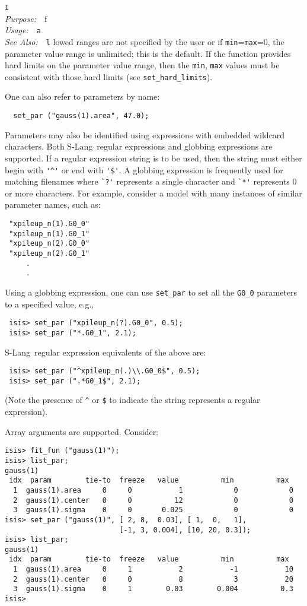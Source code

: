 \documentclass{book}
\makeatletter
\newif\ifpdf
\newcommand{\slang}{{\sc S-Lang}}
\newenvironment{isisfunction}[4]%
{\index{{#1}@{\tt #1}}%
  \ifpdf
  \else
     \addcontentsline{toc}{subsection}{{#1} -- {#2}}
  \fi
  \vbox{
          \vspace*{\baselineskip}
          {\LARGE\tt #1}\vspace*{\baselineskip}\\
          {{\it Purpose:}~~{#2}}\\
          {{\it Usage:}~~{\tt #3}}\\
          {{\it See Also:}~~{\tt #4}}
       }
}%
{ }
\makeatother
\begin{document}
{\begin{isisfunction}
If allowed ranges are not specified by the user or if
{\tt min}={\tt max}=0, the parameter value range is unlimited;
this is the default.  If the function provides hard limits
on the parameter value range, then the \verb|min|, \verb|max|
values must be consistent with those hard limits
(see \verb|set_hard_limits|).

One can also refer to parameters by name:
\begin{verbatim}
  set_par ("gauss(1).area", 47.0);
\end{verbatim}

Parameters may also be identified using expressions with
embedded wildcard characters.  Both \slang\ regular expressions and
globbing expressions are supported.  If a regular expression
string is to be used, then the string must either begin with
\verb|'^'| or end with \verb|'$'|.  %
A globbing expression is frequently used for
matching filenames where \verb|`?'| represents a single
character and \verb|`*'| represents 0 or more characters.  For
example, consider a model with many instances of similar
parameter names, such as:
\begin{verbatim}
 "xpileup_n(1).G0_0"
 "xpileup_n(1).G0_1"
 "xpileup_n(2).G0_0"
 "xpileup_n(2).G0_1"
     .
     .
\end{verbatim}
Using a globbing expression, one can use \verb|set_par| to set all
the \verb|G0_0| parameters to a specified value, e.g.,
\begin{verbatim}
 isis> set_par ("xpileup_n(?).G0_0", 0.5);
 isis> set_par ("*.G0_1", 2.1);
\end{verbatim}

\slang\ regular expression equivalents of the above are:
\begin{verbatim}
 isis> set_par ("^xpileup_n(.)\\.G0_0$", 0.5);
 isis> set_par (".*G0_1$", 2.1);
\end{verbatim}
(Note the presence of \verb|^| or \verb|$| %
to indicate the string represents a regular expression).

Array arguments are supported.  Consider:
\begin{verbatim}
isis> fit_fun ("gauss(1)");
isis> list_par;
gauss(1)
 idx  param        tie-to  freeze   value          min          max
  1  gauss(1).area     0     0           1            0            0
  2  gauss(1).center   0     0          12            0            0
  3  gauss(1).sigma    0     0       0.025            0            0
isis> set_par ("gauss(1)", [ 2, 8,  0.03], [ 1,  0,   1],
                           [-1, 3, 0.004], [10, 20, 0.3]);
isis> list_par;
gauss(1)
 idx  param        tie-to  freeze   value          min          max
  1  gauss(1).area     0     1           2           -1           10
  2  gauss(1).center   0     0           8            3           20
  3  gauss(1).sigma    0     1        0.03        0.004          0.3
isis>
\end{verbatim}


\end{isisfunction}}
\end{document}
